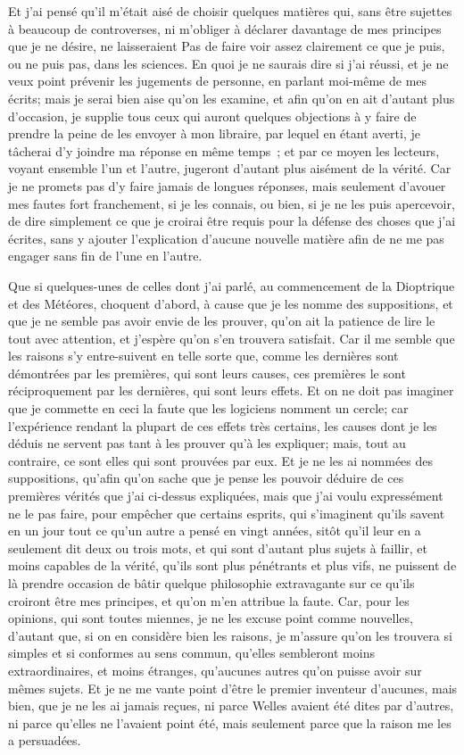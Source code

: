 \documentclass[french,twoside]{book} %
\begin{document}
Et j'ai pensé qu'il m'était aisé de choisir quelques matières qui, sans être sujettes à beaucoup de controverses, ni m'obliger à déclarer davantage de mes principes que je ne désire, ne laisseraient Pas de faire voir assez clairement ce que je puis, ou ne puis pas, dans les sciences. En quoi je ne saurais dire si j'ai réussi, et je ne veux point prévenir les jugements de personne, en parlant moi-même de mes écrits; mais je serai bien aise qu'on les examine, et afin qu'on en ait d'autant plus d'occasion, je supplie tous ceux qui auront quelques objections à y faire de prendre la peine de les envoyer à mon libraire, par lequel en étant averti, je tâcherai d'y joindre ma réponse en même temps ; et par ce moyen les lecteurs, voyant ensemble l'un et l'autre, jugeront d'autant plus aisément de la vérité. Car je ne promets pas d'y faire jamais de longues réponses, mais seulement d'avouer mes fautes fort franchement, si je les connais, ou bien, si je ne les puis apercevoir, de dire simplement ce que je croirai être requis pour la défense des choses que j'ai écrites, sans y ajouter l'explication d'aucune nouvelle matière afin de ne me pas engager sans fin de l'une en l'autre.\par
Que si quelques-unes de celles dont j'ai parlé, au commencement de la Dioptrique et des Météores, choquent d'abord, à cause que je les nomme des suppositions, et que je ne semble pas avoir envie de les prouver, qu'on ait la patience de lire le tout avec attention, et j'espère qu'on s'en trouvera satisfait. Car il me semble que les raisons s'y entre-suivent en telle sorte que, comme les dernières sont démontrées par les premières, qui sont leurs causes, ces premières le sont réciproquement par les dernières, qui sont leurs effets. Et on ne doit pas imaginer que je commette en ceci la faute que les logiciens nomment un cercle; car l'expérience rendant la plupart de ces effets très certains, les causes dont je les déduis ne servent pas tant à les prouver qu'à les expliquer; mais, tout au contraire, ce sont elles qui sont prouvées par eux. Et je ne les ai nommées des suppositions, qu'afin qu'on sache que je pense les pouvoir déduire de ces premières vérités que j'ai ci-dessus expliquées, mais que j'ai voulu expressément ne le pas faire, pour empêcher que certains esprits, qui s'imaginent qu'ils savent en un jour tout ce qu'un autre a pensé en vingt années, sitôt qu'il leur en a seulement dit deux ou trois mots, et qui sont d'autant plus sujets à faillir, et moins capables de la vérité, qu'ils sont plus pénétrants et plus vifs, ne puissent de là prendre occasion de bâtir quelque philosophie extravagante sur ce qu'ils croiront être mes principes, et qu'on m'en attribue la faute. Car, pour les opinions, qui sont toutes miennes, je ne les excuse point comme nouvelles, d'autant que, si on en considère bien les raisons, je m'assure qu'on les trouvera si simples et si conformes au sens commun, qu'elles sembleront moins extraordinaires, et moins étranges, qu'aucunes autres qu'on puisse avoir sur mêmes sujets. Et je ne me vante point d'être le premier inventeur d'aucunes, mais bien, que je ne les ai jamais reçues, ni parce Welles avaient été dites par d'autres, ni parce qu'elles ne l'avaient point été, mais seulement parce que la raison me les a persuadées.\par
\end{document}
